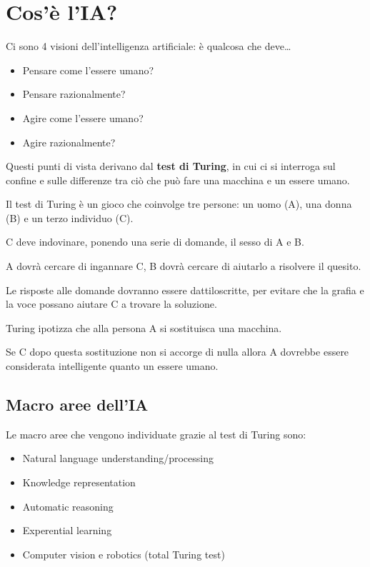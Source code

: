 \newpage

\section{Cos'è l'IA?}

Ci sono 4 visioni dell'intelligenza artificiale: è qualcosa che deve\dots

\begin{itemize}
 \item Pensare come l'essere umano?
 \item Pensare razionalmente?
 \item Agire come l'essere umano?
 \item Agire razionalmente?
\end{itemize}

Questi punti di vista derivano dal \textbf{test di Turing}, in cui ci si
interroga sul confine e sulle differenze tra ciò che può fare una macchina
e un essere umano.

Il test di Turing è un gioco che coinvolge tre persone: un uomo (A), una
donna (B) e un terzo individuo (C).

C deve indovinare, ponendo una serie di domande, il sesso di A e B.

A dovrà cercare di ingannare C, B dovrà cercare di aiutarlo a risolvere il
quesito.

Le risposte alle domande dovranno essere dattiloscritte, per evitare
che la grafia e la voce possano aiutare C a trovare la soluzione.

Turing ipotizza che alla persona A si sostituisca una macchina.

Se C dopo questa sostituzione non si accorge di nulla allora A dovrebbe
essere considerata intelligente quanto un essere umano.

\subsection{Macro aree dell'IA}

Le macro aree che vengono individuate grazie al test di Turing sono:

\begin{itemize}
 \item Natural language understanding/processing
 \item Knowledge representation
 \item Automatic reasoning
 \item Experential learning
 \item Computer vision e robotics (total Turing test)
\end{itemize}

